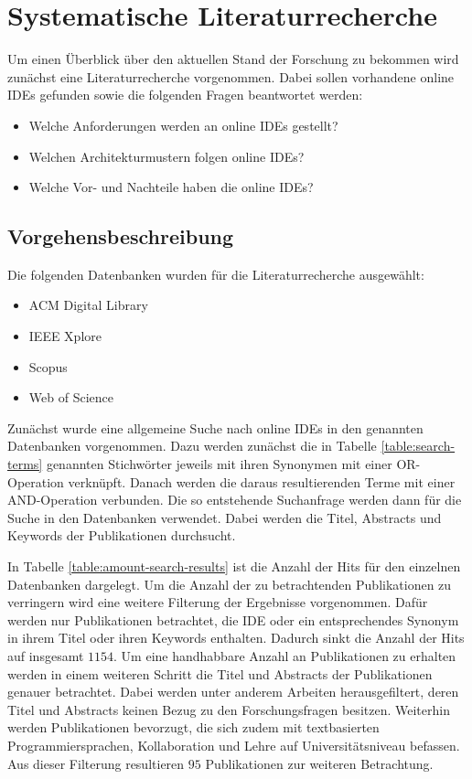 \chapter{Systematische Literaturrecherche} \label{systematische_literaturrecherche}

Um einen Überblick über den aktuellen Stand der Forschung zu bekommen wird zunächst eine Literaturrecherche vorgenommen. Dabei sollen vorhandene online IDEs gefunden sowie die folgenden Fragen beantwortet werden:

\begin{itemize}
    \item Welche Anforderungen werden an online IDEs gestellt?
    \item Welchen Architekturmustern folgen online IDEs?
    \item Welche Vor- und Nachteile haben die online IDEs?
\end{itemize}

\section{Vorgehensbeschreibung}

Die folgenden Datenbanken wurden für die Literaturrecherche ausgewählt:

\begin{itemize}
    \item ACM Digital Library
    \item IEEE Xplore
    \item Scopus
    \item Web of Science
\end{itemize}

Zunächst wurde eine allgemeine Suche nach online IDEs in den genannten Datenbanken vorgenommen. Dazu werden zunächst die in Tabelle \ref{table:search-terms} genannten Stichwörter jeweils mit ihren Synonymen mit einer OR-Operation verknüpft. Danach werden die daraus resultierenden Terme mit einer AND-Operation verbunden. Die so entstehende Suchanfrage werden dann für die Suche in den Datenbanken verwendet. Dabei werden die Titel, Abstracts und Keywords der Publikationen durchsucht.

In Tabelle \ref{table:amount-search-results} ist die Anzahl der Hits für den einzelnen Datenbanken dargelegt. Um die Anzahl der zu betrachtenden Publikationen zu verringern wird eine weitere Filterung der Ergebnisse vorgenommen. Dafür werden nur Publikationen betrachtet, die IDE oder ein entsprechendes Synonym in ihrem Titel oder ihren Keywords enthalten. Dadurch sinkt die Anzahl der Hits auf insgesamt $1154$. Um eine handhabbare Anzahl an Publikationen zu erhalten werden in einem weiteren Schritt die Titel und Abstracts der Publikationen genauer betrachtet. Dabei werden unter anderem Arbeiten herausgefiltert, deren Titel und Abstracts keinen Bezug zu den Forschungsfragen besitzen. Weiterhin werden Publikationen bevorzugt, die sich zudem mit textbasierten Programmiersprachen, Kollaboration und Lehre auf Universitätsniveau befassen. Aus dieser Filterung resultieren $95$ Publikationen zur weiteren Betrachtung.

